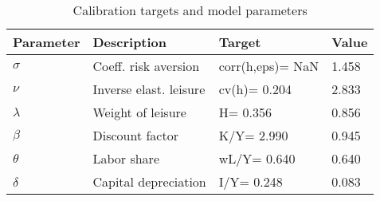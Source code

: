 \begin{table}[!htbp]
\centering
\caption{Calibration targets and model parameters}
\begin{tabular}{llll}
\toprule
Parameter & Description & Target & Value \\
\midrule
$\sigma$  & Coeff. risk aversion   & corr(h,eps)= NaN & 1.458 \\
$\nu$     & Inverse elast. leisure & cv(h)= 0.204       & 2.833 \\
$\lambda$ & Weight of leisure      & H= 0.356           & 0.856 \\
$\beta$   & Discount factor        & K/Y= 2.990         & 0.945 \\
$\theta$  & Labor share            & wL/Y= 0.640        & 0.640 \\
$\delta$  & Capital depreciation   & I/Y= 0.248         & 0.083 \\
\bottomrule
\end{tabular}
\end{table}
